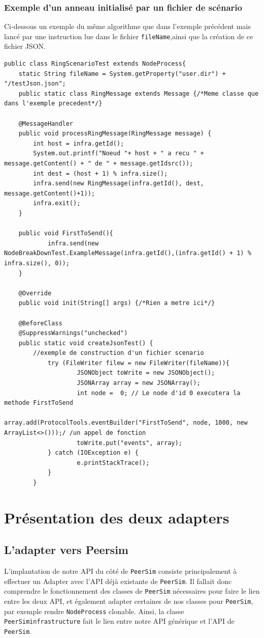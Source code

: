 \documentclass{article}
\begin{document}
							\subsubsection{Exemple d'un anneau initialisé par un fichier de scénario}
						Ci-dessous un exemple du même algorithme que dans l'exemple précédent mais lancé par une instruction lue dans le fichier \verb|fileName|,ainsi que 
						la création de ce fichier JSON.
						\begin{lstlisting}
public class RingScenarioTest extends NodeProcess{
	static String fileName = System.getProperty("user.dir") + "/testJson.json";
	public static class RingMessage extends Message {/*Meme classe que dans l'exemple precedent*/}

	@MessageHandler
	public void processRingMessage(RingMessage message) {
		int host = infra.getId();
		System.out.printf("Noeud "+ host + " a recu " + message.getContent() + " de " + message.getIdsrc());
		int dest = (host + 1) % infra.size();
		infra.send(new RingMessage(infra.getId(), dest, message.getContent()+1));
		infra.exit();
    }

	public void FirstToSend(){
        	infra.send(new NodeBreakDownTest.ExampleMessage(infra.getId(),(infra.getId() + 1) % infra.size(), 0));
    }

	@Override
	public void init(String[] args) {/*Rien a metre ici*/}

	@BeforeClass
	@SuppressWarnings("unchecked")
	public static void createJsonTest() {
		//exemple de construction d'un fichier scenario
        	try (FileWriter filew = new FileWriter(fileName)){
            		JSONObject toWrite = new JSONObject();
            		JSONArray array = new JSONArray();
            		int node =  0; // Le node d'id 0 executera la methode FirstToSend
            		array.add(ProtocolTools.eventBuilder("FirstToSend", node, 1000, new ArrayList<>()));/ /un appel de fonction
            		toWrite.put("events", array);
       		} catch (IOException e) {
            		e.printStackTrace();
        	}
    	}
						\end{lstlisting}
						\newpage
							
		
						\section{Présentation des deux adapters}
						
						\subsection{L'adapter vers Peersim}
						L'implantation de notre API du côté de \verb|PeerSim| consiste principalement à effectuer un Adapter avec l'API déjà existante de \verb|PeerSim|. Il fallait donc comprendre le fonctionnement des classes de \verb|PeerSim| nécessaires pour faire le lien entre les deux API,  
						et également adapter certaines de nos classes pour \verb|PeerSim|, par exemple rendre \verb|NodeProcess| clonable. 
						\newline
						Ainsi, la classe \verb|PeerSiminfrastructure| fait le lien entre notre API générique et l'API de \verb|PeerSim|.
\end{document}
